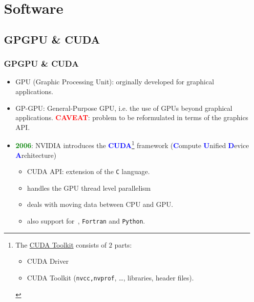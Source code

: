 \section{Software}
\subsection{GPGPU \& CUDA}
\begin{frame}
  \frametitle{GPGPU \& CUDA}
     \begin{itemize}
        \item GPU (Graphic Processing Unit):\newline 
	      orginally developed for graphical applications.
        \item GP-GPU: General-Purpose GPU, i.e.\newline 
	      the use of GPUs beyond graphical applications.\newline
	      \textbf{\textcolor{red}{CAVEAT}}: problem to be reformulated in terms of the graphics API.
      \item \textbf{\textcolor{green}{2006}}: NVIDIA introduces the \textbf{\textcolor{blue}{CUDA}}\footnote{The \href{https://developer.nvidia.com/cuda-downloads}{CUDA Toolkit} consists of $2$ parts: 
      \begin{itemize} 
	      \item CUDA Driver 
	      \item CUDA Toolkit (\texttt{nvcc,nvprof}, \ldots, libraries, header files).
      \end{itemize} } framework\newline 
		(\textbf{\textcolor{blue}{C}}ompute \textbf{\textcolor{blue}{U}}nified 
		     \textbf{\textcolor{blue}{D}}evice \textbf{\textcolor{blue}{A}}rchitecture) 
              \begin{itemize}
	         \item CUDA API: extension of the \texttt{C} language.
                 \item handles the GPU thread level parallelism
                 \item deals with moving data between CPU and GPU.
		 \item also support for \CC\,, \texttt{Fortran} and \texttt{Python}.			 
              \end{itemize}			 
     \end{itemize}		     
\end{frame} 

